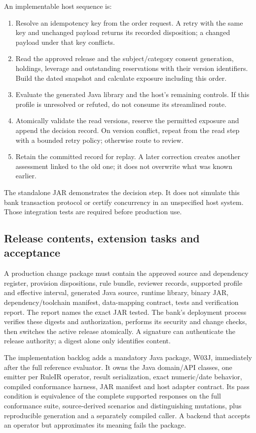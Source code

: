An implementable host sequence is:
\begin{enumerate}
\item Resolve an idempotency key from the order request. A retry with the same
key and unchanged payload returns its recorded disposition; a changed payload
under that key conflicts.
\item Read the approved release and the subject/category consent generation,
holdings, leverage and outstanding reservations with their version identifiers.
Build the dated snapshot and calculate exposure including this order.
\item Evaluate the generated Java library and the host's remaining controls.
If this profile is unresolved or refuted, do not consume its streamlined route.
\item Atomically validate the read versions, reserve the permitted exposure and
append the decision record. On version conflict, repeat from the read step with
a bounded retry policy; otherwise route to review.
\item Retain the committed record for replay. A later correction creates another
assessment linked to the old one; it does not overwrite what was known earlier.
\end{enumerate}
The standalone JAR demonstrates the decision step. It does not simulate this
bank transaction protocol or certify concurrency in an unspecified host system.
Those integration tests are required before production use.

\subsection{Release contents, extension tasks and acceptance}

A production change package must contain the approved source and dependency
register, provision dispositions, rule bundle, reviewer records, supported
profile and effective interval, generated Java source, runtime library, binary
JAR, dependency/toolchain manifest, data-mapping contract, tests and verification
report. The report names the exact JAR tested. The bank's deployment process
verifies these digests and authorization, performs its security and change checks,
then switches the active release atomically. A signature can authenticate the
release authority; a digest alone only identifies content.

The implementation backlog adds a mandatory Java package, W03J, immediately
after the full reference evaluator. It owns the Java domain/API classes, one
emitter per RuleIR operator, result serialization, exact numeric/date behavior,
compiled conformance harness, JAR manifest and host adapter contract. Its pass
condition is equivalence of the complete supported responses on the full
conformance suite, source-derived scenarios and distinguishing mutations,
plus reproducible generation and a separately compiled caller. A backend that
accepts an operator but approximates its meaning fails the package.

